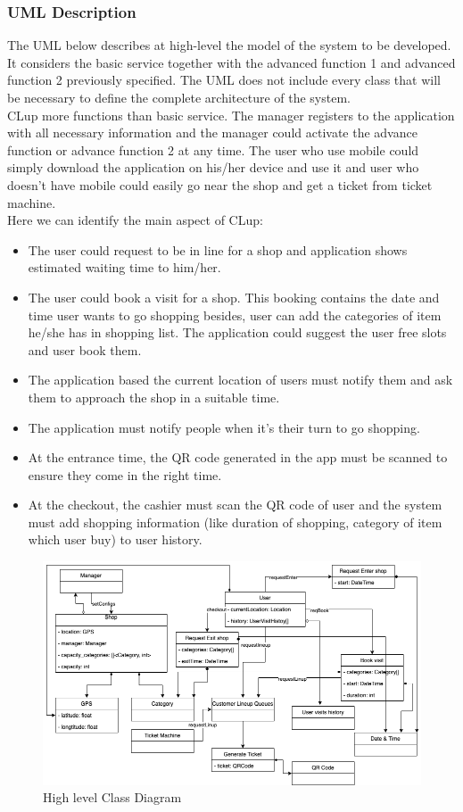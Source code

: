 \subsubsection{UML Description}
The UML below describes at high-level the model of the system to be developed. It considers the basic service together with the advanced function 1 and advanced function 2 previously specified. The UML does not include every class that will be necessary to define the complete architecture of the system.\\
CLup more functions than basic service. The manager registers to the application with all necessary information and the manager could activate the advance function or advance function 2 at any time. The user who use mobile could simply download the application on his/her device and use it and user who doesn't have mobile could easily go near the shop and get a ticket from ticket machine.\\
Here we can identify the main aspect of CLup:
\begin{itemize}
    \item The user could request to be in line for a shop and application shows estimated waiting time to him/her.
    \item The user could book a visit for a shop. This booking contains the date and time user wants to go shopping besides, user can add the categories of item he/she has in shopping list. The application could suggest the user free slots and user book them.
    \item The application based the current location of users must notify them and ask them to approach the shop in a suitable time.
    \item The application must notify people when it's their turn to go shopping.
    \item At the entrance time, the QR code generated in the app must be scanned to ensure they come in the right time.
    \item At the checkout, the cashier must scan the QR code of user and the system must add shopping information (like duration of shopping, category of item which user buy) to user history.
\end{itemize}

\begin{figure}[H]
  \includegraphics[width=\textwidth,height=\textheight,keepaspectratio]{images/ClassDiagram.png}
  \caption{High level Class Diagram}
  \label{fig:ClassDiagram}
\end{figure}

